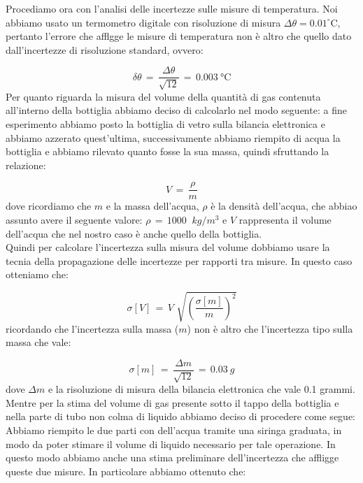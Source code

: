 Procediamo ora con l'analisi delle incertezze sulle misure di temperatura. Noi abbiamo usato un termometro digitale con risoluzione di misura $\Delta \theta = 0.01 ^\circ$C, pertanto l'errore che afflgge le misure di temperatura non è altro che quello dato dall'incertezze di risoluzione standard, ovvero:

\begin{equation*}
	\delta \theta \,=\, \frac{\Delta \theta}{\sqrt{12}} \,=\, \SI{0.003}{\celsius}
\end{equation*}
%
Per quanto riguarda la misura del volume della quantità di gas contenuta all'interno della bottiglia abbiamo deciso di calcolarlo nel modo seguente: a fine esperimento abbiamo posto la bottiglia di vetro sulla bilancia elettronica e abbiamo azzerato quest'ultima, successivamente abbiamo riempito di acqua la bottiglia e abbiamo rilevato quanto fosse la sua massa, quindi sfruttando la relazione:

\begin{equation*}
	V \,=\, \frac{\rho}{m}  
\end{equation*}
%
dove ricordiamo che $m$ e la massa dell'acqua, $\rho$ è la densità dell'acqua, che abbiao assunto avere il seguente valore: $\rho \,=\, \SI{1000}{\,\,kg/m^3}$ e $V$ rappresenta il volume dell'acqua che nel nostro caso è anche quello della bottiglia.\\
Quindi per calcolare l'incertezza sulla misura del volume dobbiamo usare la tecnia della propagazione delle incertezze per rapporti tra misure. In questo caso otteniamo che:

\begin{equation*}
	\sigma [V] \,=\, V \,\, \sqrt{\left(\frac{\sigma [m]}{m}\right)^2}  
\end{equation*}
%
ricordando che l'incertezza sulla massa ($m$) non è altro che l'incertezza tipo sulla massa che vale:

\begin{equation*}
	\sigma [m] \,=\, \frac{\Delta m}{\sqrt{12}} \,=\, \SI{0.03}{g}
\end{equation*}
%
dove $\Delta m$ e la risoluzione di misura della bilancia elettronica che vale 0.1 grammi.\\
Mentre per la stima del volume di gas presente sotto il tappo della bottiglia e nella parte di tubo non colma di liquido abbiamo deciso di procedere come segue: Abbiamo riempito le due parti con dell'acqua tramite una siringa graduata, in modo da poter stimare il volume di liquido necessario per tale operazione. In questo modo abbiamo anche una stima preliminare dell'incertezza che affligge queste due misure. In particolare abbiamo ottenuto che:

